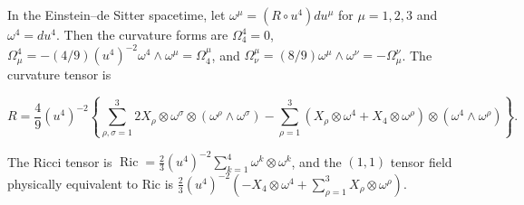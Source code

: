 In the Einstein–de Sitter spacetime, let $\omega^\mu = (R \circ u^4) du^\mu$ for $\mu = 1, 2, 3$ and $\omega^4 = du^4$. Then the curvature forms are $\Omega_4^4 = 0$, $\Omega_\mu^4 = -(4/9)(u^4)^{-2}\omega^4 \wedge \omega^\mu = \Omega_4^\mu$, and $\Omega_\nu^\mu = (8/9)\omega^\mu \wedge \omega^\nu = -\Omega_\mu^\nu$. The curvature tensor is

$$R = \frac{4}{9}(u^4)^{-2} \left\{ \sum_{\rho,\sigma=1}^3 2X_\rho \otimes \omega^\sigma \otimes (\omega^\rho \wedge \omega^\sigma) - \sum_{\rho=1}^3 (X_\rho \otimes \omega^4 + X_4 \otimes \omega^\rho) \otimes (\omega^4 \wedge \omega^\rho) \right\}.$$

The Ricci tensor is $\operatorname{Ric} = \frac{2}{3}(u^4)^{-2} \sum_{k=1}^4 \omega^k \otimes \omega^k$, and the $(1,1)$ tensor field physically equivalent to Ric is $\frac{2}{3}(u^4)^{-2}(-X_4 \otimes \omega^4 + \sum_{\rho=1}^3 X_\rho \otimes \omega^\rho)$.
